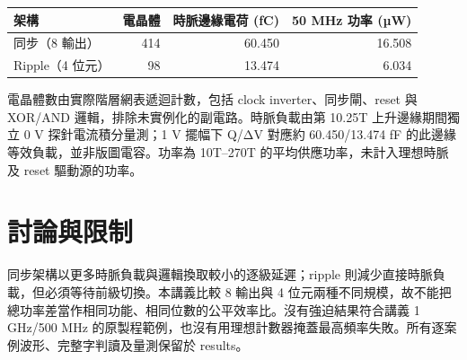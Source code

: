 \begin{center}\small
\begin{tabular}{lrrr}
\toprule
架構 & 電晶體 & 時脈邊緣電荷 (fC) & 50 MHz 功率 (µW) \\
\midrule
同步（8 輸出） & 414 & 60.450 & 16.508 \\
Ripple（4 位元） & 98 & 13.474 & 6.034 \\
\bottomrule
\end{tabular}
\end{center}

電晶體數由實際階層網表遞迴計數，包括 clock inverter、同步閘、reset 與 XOR/AND 邏輯，排除未實例化的副電路。時脈負載由第 10.25T 上升邊緣期間獨立 0 V 探針電流積分量測；1 V 擺幅下 Q/ΔV 對應約 60.450/13.474 fF 的此邊緣等效負載，並非版圖電容。功率為 10T--270T 的平均供應功率，未計入理想時脈及 reset 驅動源的功率。

\section{討論與限制}

同步架構以更多時脈負載與邏輯換取較小的逐級延遲；ripple 則減少直接時脈負載，但必須等待前級切換。本講義比較 8 輸出與 4 位元兩種不同規模，故不能把總功率差當作相同功能、相同位數的公平效率比。沒有強迫結果符合講義 1 GHz/500 MHz 的原製程範例，也沒有用理想計數器掩蓋最高頻率失敗。所有逐案例波形、完整字判讀及量測保留於 results。
